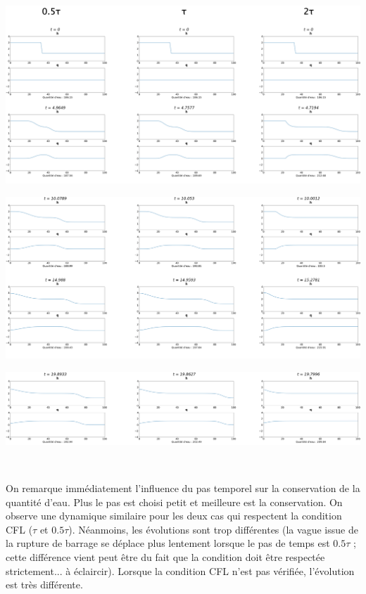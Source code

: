 \documentclass[
11pt, %
francais, %
singlespacing, %
headsepline, %
]{MastersDoctoralThesis} %
\begin{document}
\begin{center}
\includegraphics[scale=0.35]{part1.png} 

\includegraphics[scale=0.35]{part2.png} 

\includegraphics[scale=0.35]{part3.png} 
\end{center}

\

On remarque immédiatement l'influence du pas temporel sur la conservation de la quantité d'eau. Plus le pas est choisi petit et meilleure est la conservation. On observe une dynamique similaire pour les deux cas qui respectent la condition CFL ($\tau$ et $0.5\tau$). Néanmoins, les évolutions sont trop différentes (la vague issue de la rupture de barrage se déplace plus lentement lorsque le pas de temps est $0.5\tau$ ; cette différence vient peut être du fait que la condition doit être respectée strictement... à éclaircir). Lorsque la condition CFL n'est pas vérifiée, l'évolution est très différente.
\end{document}
